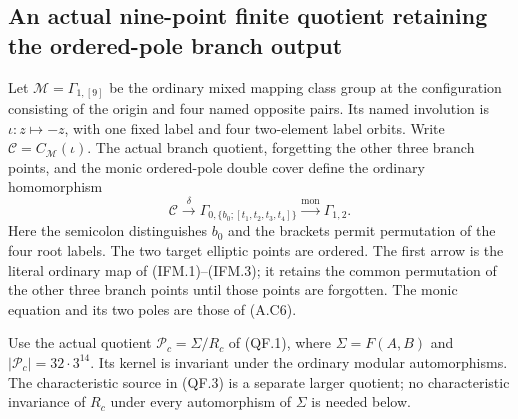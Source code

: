 \subsection{An actual nine-point finite quotient retaining the ordered-pole branch output}

Let $\mathcal M=\Gamma_{1,[9]}$ be the ordinary mixed mapping
class group at the configuration consisting of the origin and
four named opposite pairs.  Its named involution is
$\iota:z\mapsto-z$, with one fixed label and four two-element
label orbits.  Write
$\mathcal C=C_{\mathcal M}(\iota)$.
The actual branch quotient, forgetting the other three branch
points, and the monic ordered-pole double cover define the
ordinary homomorphism
\[
 \mathcal C\xrightarrow{\delta}
       \Gamma_{0,\{b_0;[t_1,t_2,t_3,t_4]\}}
       \xrightarrow{\operatorname{mon}}\Gamma_{1,2}.
                                                               \tag{FBO.1}
\]
Here the semicolon distinguishes $b_0$ and the brackets permit
permutation of the four root labels.  The two target elliptic
points are ordered.  The first arrow is the literal ordinary
map of (IFM.1)--(IFM.3); it retains the common permutation of
the other three branch points until those points are forgotten.
The monic equation and its two poles are those of (A.C6).

Use the actual quotient $\mathcal P_c=\Sigma/R_c$ of
(QF.1), where $\Sigma=F(A,B)$ and
$|\mathcal P_c|=32\cdot3^{14}$.  Its kernel is invariant under
the ordinary modular automorphisms.  The characteristic
source in (QF.3) is a separate larger quotient; no characteristic
invariance of $R_c$ under every automorphism of $\Sigma$ is
needed below.

